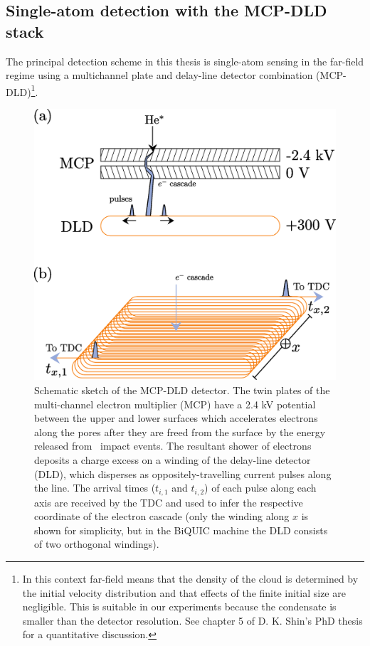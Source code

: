 \subsection*{Single-atom detection with the MCP-DLD stack}
	\label{sec:DLD}
	The principal detection scheme in this thesis is single-atom sensing in the far-field regime using a multichannel plate and delay-line detector combination (MCP-DLD)\footnote{In this context far-field means that the density of the cloud is determined by the initial velocity distribution and that effects of the finite initial size are negligible. This is suitable in our experiments because the condensate is smaller than the detector resolution. See chapter 5 of D. K. Shin's PhD thesis \cite{ShinThesis} for a quantitative discussion.}.
	

	\begin{figure}
		\centering
		\includegraphics[width=\textwidth]{fig/apparatus/mcp_dld_schematic}
		\caption{Schematic sketch of the MCP-DLD detector. The twin plates of the multi-channel electron multiplier (MCP) have a 2.4 kV potential between the upper and lower surfaces which accelerates electrons along the pores after they are freed from the surface by the energy released from \mhe~impact events. The resultant shower of electrons deposits a charge excess on a winding of the delay-line detector (DLD), which disperses as oppositely-travelling current pulses along the line. The arrival times ($t_{i,1}$ and $t_{i,2}$) of each pulse along each axis are received by the TDC and used to infer the respective coordinate of the electron cascade (only the winding along $x$ is shown for simplicity, but in the BiQUIC machine the DLD consists of two orthogonal windings).}
		\label{fig:MCP_DLD}
	\end{figure}


